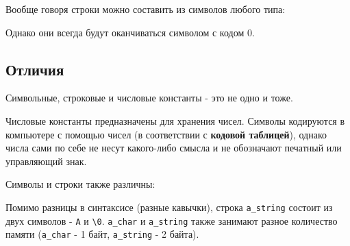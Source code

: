 Вообще говоря строки можно составить из символов любого типа:

\begin{Shaded}
\begin{Highlighting}[]
  \OperatorTok{*}\OperatorTok{=} \OperatorTok{;}
  \OperatorTok{*}\OperatorTok{=} \OperatorTok{;}
  \OperatorTok{*}\OperatorTok{=} \OperatorTok{;}
  \OperatorTok{*}\OperatorTok{=} \OperatorTok{;}
\end{Highlighting}
\end{Shaded}

Однако они всегда будут оканчиваться символом с кодом 0.

\subsection{Отличия}\label{ux43eux442ux43bux438ux447ux438ux44f}

Символьные, строковые и числовые константы - это не одно и тоже.

Числовые константы предназначены для хранения чисел. Символы кодируются
в компьютере с помощью чисел (в соответствии с \textbf{кодовой
таблицей}), однако числа сами по себе не несут какого-либо смысла и не
обозначают печатный или управляющий знак.

Символы и строки также различны:

\begin{Shaded}
\begin{Highlighting}[]
\OperatorTok{=} \OperatorTok{;}
  \OperatorTok{*}\OperatorTok{=} \OperatorTok{;}
\end{Highlighting}
\end{Shaded}

Помимо разницы в синтаксисе (разные кавычки), строка \texttt{a\_string}
состоит из двух символов -
\texttt{\textquotesingle{}A\textquotesingle{}} и
\texttt{\textquotesingle{}\textbackslash{}0\textquotesingle{}}.
\texttt{a\_char} и \texttt{a\_string} также занимают разное количество
памяти (\texttt{a\_char} - 1 байт, \texttt{a\_string} - 2 байта).

